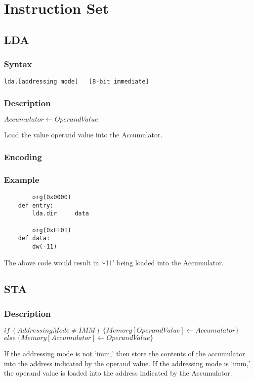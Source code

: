 \section{Instruction Set}\label{sec:instruction-set}
\pagebreak
\subsection{LDA}\label{subsec:lda}
    \subsubsection{Syntax}
    \begin{verbatim}lda.[addressing mode]   [8-bit immediate] \end{verbatim}
    \subsubsection{Description}
    $Accumulator \leftarrow OperandValue$
    \par Load the value operand value into the Accumulator.

    \subsubsection{Encoding}
    \subsubsection{Example}
    \begin{verbatim}
        org(0x0000)
    def entry:
        lda.dir     data

        org(0xFF01)
    def data:
        dw(-11)
    \end{verbatim}
    \par The above code would result in `-11' being loaded into the Accumulator.

\pagebreak
\subsection{STA}\label{subsec:sta}
    \subsubsection{Description}
    $if\ (AddressingMode \neq IMM)\ \{ Memory[OperandValue] \leftarrow Accumulator \}$ \\
    $else\ \{ Memory[Accumulator] \leftarrow OperandValue \}$
    \par If the addressing mode is not `imm,' then store the contents of the accumulator into the address indicated by
    the operand value.
    If the addressing mode is `imm,' the operand value is loaded into the address indicated by the Accumulator.

